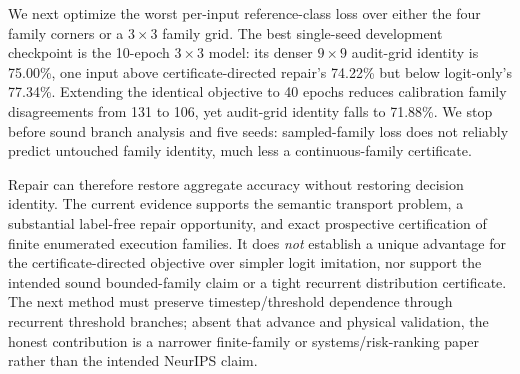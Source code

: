 We next optimize the worst per-input reference-class loss over either the four
family corners or a $3\times3$ family grid. The best single-seed development
checkpoint is the 10-epoch $3\times3$ model: its denser $9\times9$ audit-grid
identity is 75.00\%, one input above certificate-directed repair's 74.22\% but
below logit-only's 77.34\%. Extending the identical objective to 40 epochs
reduces calibration family disagreements from 131 to 106, yet audit-grid
identity falls to 71.88\%. We stop before sound branch analysis and five seeds:
sampled-family loss does not reliably predict untouched family identity, much
less a continuous-family certificate.

Repair can therefore restore aggregate accuracy without restoring decision
identity. The current evidence supports the semantic transport problem, a
substantial label-free repair opportunity, and exact prospective certification
of finite enumerated execution families. It does \emph{not} establish a unique
advantage for the certificate-directed objective over simpler logit imitation,
nor support the intended sound bounded-family claim or a tight recurrent
distribution certificate. The next method must preserve timestep/threshold
dependence through recurrent threshold branches; absent that advance and
physical validation, the honest contribution is a narrower finite-family or
systems/risk-ranking paper rather than the intended NeurIPS claim.
